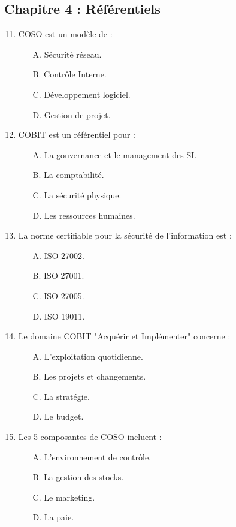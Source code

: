 \subsection*{Chapitre 4 : Référentiels}
\begin{enumerate}
    \setcounter{enumi}{10}
    \item COSO est un modèle de :
    \begin{itemize} \item[A.] Sécurité réseau. \item[B.] Contrôle Interne. \item[C.] Développement logiciel. \item[D.] Gestion de projet. \end{itemize}
    \item COBIT est un référentiel pour :
    \begin{itemize} \item[A.] La gouvernance et le management des SI. \item[B.] La comptabilité. \item[C.] La sécurité physique. \item[D.] Les ressources humaines. \end{itemize}
    \item La norme certifiable pour la sécurité de l'information est :
    \begin{itemize} \item[A.] ISO 27002. \item[B.] ISO 27001. \item[C.] ISO 27005. \item[D.] ISO 19011. \end{itemize}
    \item Le domaine COBIT "Acquérir et Implémenter" concerne :
    \begin{itemize} \item[A.] L'exploitation quotidienne. \item[B.] Les projets et changements. \item[C.] La stratégie. \item[D.] Le budget. \end{itemize}
    \item Les 5 composantes de COSO incluent :
    \begin{itemize} \item[A.] L'environnement de contrôle. \item[B.] La gestion des stocks. \item[C.] Le marketing. \item[D.] La paie. \end{itemize}
\end{enumerate}

